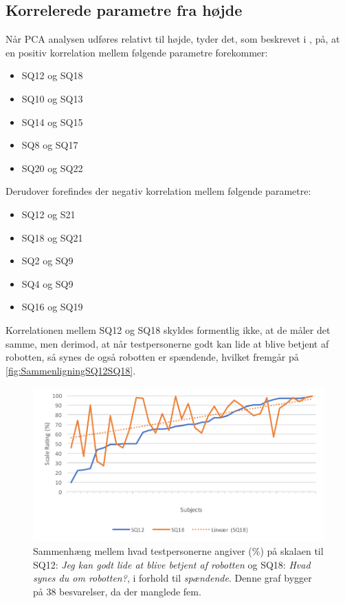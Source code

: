 \subsection{Korrelerede parametre fra højde}
\label{DatabehandlingSammenligningKorreleredeHoejde}
%
Når PCA analysen udføres relativt til højde, tyder det, som beskrevet i , på, at en positiv korrelation mellem følgende parametre forekommer:
%
\begin{itemize}
	\item SQ12 og SQ18
	\item SQ10 og SQ13 
	\item SQ14 og SQ15
	\item SQ8 og SQ17
	\item SQ20 og SQ22\blankline
\end{itemize}
\noindent
%
Derudover forefindes der negativ korrelation mellem følgende parametre:
%
\begin{itemize}
	\item SQ12 og S21
	\item SQ18 og SQ21
	\item SQ2 og SQ9
	\item SQ4 og SQ9
	\item SQ16 og SQ19\blankline
\end{itemize}
\newpage
\noindent
%
Korrelationen mellem SQ12 og SQ18 skyldes formentlig ikke, at de måler det samme, men derimod, at når testpersonerne godt kan lide at blive betjent af robotten, så synes de også robotten er spændende, hvilket fremgår på \autoref{fig:SammenligningSQ12SQ18}. 
%
\begin{figure}[H]
	\centering
	\includegraphics[width=\textwidth]{Figure/Korrelationsgrafer/SQ12+SQ18}
	\caption{Sammenhæng mellem hvad testpersonerne angiver (\%) på skalaen til SQ12: \textit{Jeg kan godt lide at blive betjent af robotten} og SQ18: \textit{Hvad synes du om robotten?}, i forhold til \textit{spændende}. Denne graf bygger på 38 besvarelser, da der manglede fem.}
	\label{fig:SammenligningSQ12SQ18}
\end{figure}
